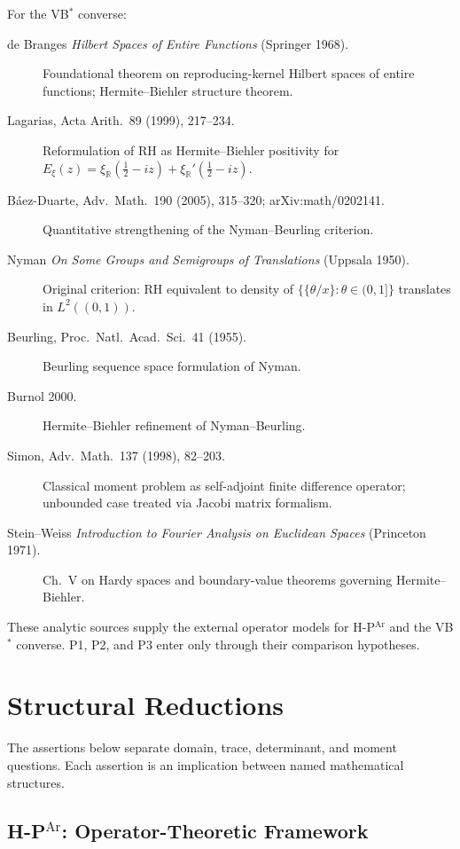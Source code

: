 For the VB\(^{*}\) converse:
\begin{description}
\item[de Branges \emph{Hilbert Spaces of Entire Functions} (Springer
1968).] Foundational theorem on reproducing-kernel Hilbert spaces of
entire functions; Hermite--Biehler structure theorem.
\item[Lagarias, Acta Arith.~89 (1999), 217--234.] Reformulation of
RH as Hermite--Biehler positivity for
\(E_{\xi}(z)=\xi_{\mathbb R}(\tfrac{1}{2}-iz)+
\xi_{\mathbb R}'(\tfrac{1}{2}-iz)\).
\item[B\'aez-Duarte, Adv.~Math.~190 (2005), 315--320; arXiv:math/0202141.]
Quantitative strengthening of the Nyman--Beurling criterion.
\item[Nyman \emph{On Some Groups and Semigroups of Translations}
(Uppsala 1950).] Original criterion: RH equivalent to density of
\(\{\{\theta/x\}: \theta\in(0,1]\}\) translates in
\(L^{2}((0,1))\).
\item[Beurling, Proc.~Natl.~Acad.~Sci.~41 (1955).] Beurling sequence
space formulation of Nyman.
\item[Burnol 2000.] Hermite--Biehler
refinement of Nyman--Beurling.
\item[Simon, Adv.~Math.~137 (1998), 82--203.] Classical moment problem
as self-adjoint finite difference operator; unbounded case treated via
Jacobi matrix formalism.
\item[Stein--Weiss \emph{Introduction to Fourier Analysis on
Euclidean Spaces} (Princeton 1971).] Ch.~V on Hardy spaces and
boundary-value theorems governing Hermite--Biehler.
\end{description}

These analytic sources supply the external operator models for
H-P\(^{\mathrm{Ar}}\) and the VB\(^{*}\) converse.  P1, P2, and P3
enter only through their comparison hypotheses.

\section{Structural Reductions}
\label{v4-arith:hpvbconv:table}

The assertions below separate domain, trace, determinant, and moment
questions. Each assertion is an implication between named mathematical
structures.

\subsection{H-P\(^{\mathrm{Ar}}\): Operator-Theoretic Framework}
\label{v4-arith:hpvbconv:cycle-1}

